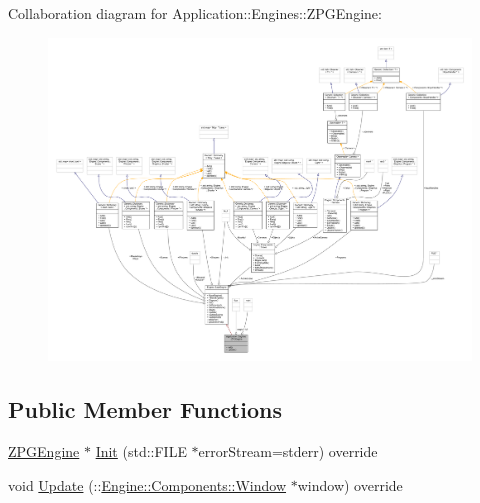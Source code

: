 Collaboration diagram for Application\+:\+:Engines\+:\+:Z\+P\+G\+Engine\+:
\nopagebreak
\begin{figure}[H]
\begin{center}
\leavevmode
\includegraphics[width=350pt]{classApplication_1_1Engines_1_1ZPGEngine__coll__graph}
\end{center}
\end{figure}
\subsection*{Public Member Functions}
\begin{DoxyCompactItemize}
\item 
\mbox{\hyperlink{classApplication_1_1Engines_1_1ZPGEngine}{Z\+P\+G\+Engine}} $\ast$ \mbox{\hyperlink{classApplication_1_1Engines_1_1ZPGEngine_a08a065a6200bf4465b71efa08f173cc5}{Init}} (std\+::\+F\+I\+LE $\ast$error\+Stream=stderr) override
\item 
void \mbox{\hyperlink{classApplication_1_1Engines_1_1ZPGEngine_a44b3d077ad688846aaa40d95ad14f851}{Update}} (\+::\mbox{\hyperlink{classEngine_1_1Components_1_1Window}{Engine\+::\+Components\+::\+Window}} $\ast$window) override
\end{DoxyCompactItemize}
